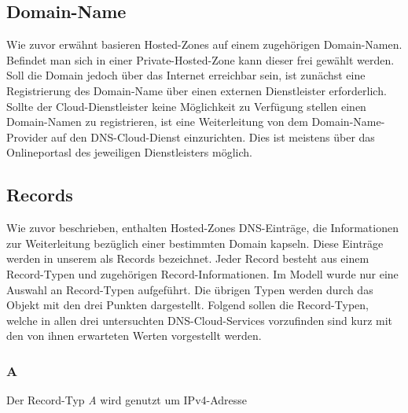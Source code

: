 \subsection{Domain-Name}
Wie zuvor erwähnt basieren Hosted-Zones auf einem zugehörigen Domain-Namen. Befindet man sich in einer Private-Hosted-Zone kann dieser frei gewählt werden. Soll die Domain jedoch über das Internet erreichbar sein, ist zunächst eine Registrierung des Domain-Name über einen externen Dienstleister erforderlich. Sollte der Cloud-Dienstleister keine Möglichkeit zu Verfügung stellen einen Domain-Namen zu registrieren, ist eine Weiterleitung von dem Domain-Name-Provider auf den DNS-Cloud-Dienst einzurichten. Dies ist meistens über das Onlineportasl des jeweiligen Dienstleisters möglich.

\subsection{Records}
Wie zuvor beschrieben, enthalten Hosted-Zones DNS-Einträge, die Informationen zur Weiterleitung bezüglich einer bestimmten Domain kapseln. Diese Einträge werden in unserem als Records bezeichnet. Jeder Record besteht aus einem Record-Typen und zugehörigen Record-Informationen. Im Modell wurde nur eine Auswahl an Record-Typen aufgeführt. Die übrigen Typen werden durch das Objekt mit den drei Punkten dargestellt. Folgend sollen die Record-Typen, welche in allen drei untersuchten DNS-Cloud-Services vorzufinden sind kurz mit den von ihnen erwarteten Werten vorgestellt werden.

\subsubsection{A}
Der Record-Typ \textit{A} wird genutzt um IPv4-Adresse
